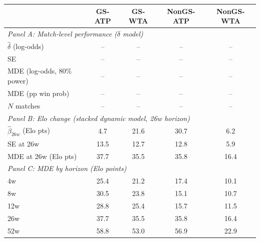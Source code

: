 \begin{tabular}{lcccc}
\toprule
 & GS-ATP & GS-WTA & NonGS-ATP & NonGS-WTA \\
\midrule
\multicolumn{5}{l}{\textit{Panel A: Match-level performance ($\delta$ model)}} \\
$\hat{\delta}$ (log-odds) & -- & -- & -- & -- \\
SE & -- & -- & -- & -- \\
MDE (log-odds, 80\% power) & -- & -- & -- & -- \\
MDE (pp win prob) & -- & -- & -- & -- \\
$N$ matches & -- & -- & -- & -- \\
\midrule
\multicolumn{5}{l}{\textit{Panel B: Elo change (stacked dynamic model, 26w horizon)}} \\
$\hat{\beta}_{26w}$ (Elo pts) & 4.7 & 21.6 & 30.7 & 6.2 \\
SE at 26w & 13.5 & 12.7 & 12.8 & 5.9 \\
MDE at 26w (Elo pts) & 37.7 & 35.5 & 35.8 & 16.4 \\
\midrule
\multicolumn{5}{l}{\textit{Panel C: MDE by horizon (Elo points)}} \\
\quad 4w & 25.4 & 21.2 & 17.4 & 10.1 \\
\quad 8w & 30.5 & 23.8 & 15.1 & 10.7 \\
\quad 12w & 28.8 & 25.4 & 15.7 & 11.5 \\
\quad 26w & 37.7 & 35.5 & 35.8 & 16.4 \\
\quad 52w & 58.8 & 53.0 & 56.9 & 22.9 \\
\bottomrule
\end{tabular}
